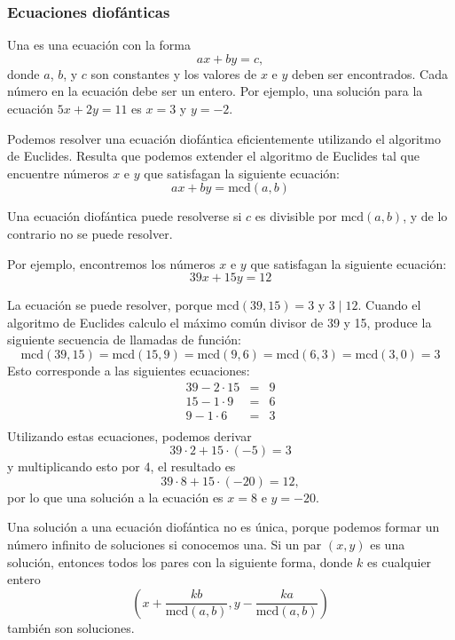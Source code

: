 \subsubsection*{Ecuaciones diofánticas}


Una  es una ecuación con la forma \[ ax + by = c, \]
donde $a$, $b$, y $c$ son constantes y los valores de $x$ e $y$ deben ser
encontrados. Cada número en la ecuación debe ser un entero. Por ejemplo, una
solución para la ecuación $5x+2y=11$ es $x=3$ y $y=-2$.


Podemos resolver una ecuación diofántica eficientemente utilizando el
algoritmo de Euclides. Resulta que podemos extender el algoritmo de
Euclides tal que encuentre números $x$ e $y$ que satisfagan la siguiente
ecuación: \[ax + by = \textrm{mcd}(a,b)\]

Una ecuación diofántica puede resolverse si $c$ es divisible por
$\textrm{mcd}(a,b)$, y de lo contrario no se puede resolver.

Por ejemplo, encontremos los números $x$ e $y$ que satisfagan la siguiente
ecuación: \[39x + 15y = 12\]

La ecuación se puede resolver, porque $\textrm{mcd}(39,15)=3$ y $3 \mid 12$.
Cuando el algoritmo de Euclides calculo el máximo común divisor de 39 y 15,
produce la siguiente secuencia de llamadas de función:
\[
    \textrm{mcd}(39,15) = \textrm{mcd}(15,9)
    = \textrm{mcd}(9,6) = \textrm{mcd}(6,3)
    = \textrm{mcd}(3,0) = 3 \]
Esto corresponde a las siguientes ecuaciones:
\[
    \begin{array}{lcl}
        39 - 2 \cdot 15 & = & 9 \\
        15 - 1 \cdot 9  & = & 6 \\
        9 - 1 \cdot 6   & = & 3 \\
    \end{array}
\]
Utilizando estas ecuaciones, podemos derivar
\[
    39 \cdot 2 + 15 \cdot (-5) = 3
\]
y multiplicando esto por 4, el resultado es
\[
    39 \cdot 8 + 15 \cdot (-20) = 12,
\]
por lo que una solución a la ecuación es $x=8$ e $y=-20$.

Una solución a una ecuación diofántica no es única, porque podemos formar un
número infinito de soluciones si conocemos una. Si un par $(x,y)$ es una
solución, entonces todos los pares con la siguiente forma, donde $k$ es cualquier entero
\[\left(x+\frac{kb}{\textrm{mcd}(a,b)},y-\frac{ka}{\textrm{mcd}(a,b)}\right)\]
también son soluciones.

